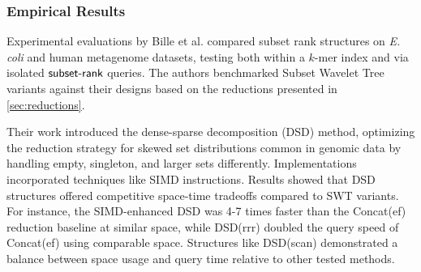 
\subsubsection*{Empirical Results}
Experimental evaluations by Bille et al. \cite{bille2023rank} compared subset rank structures on \emph{E. coli} and human metagenome datasets, testing both within a $k$-mer index and via isolated $\textsf{subset-rank}$ queries. The authors benchmarked Subset Wavelet Tree variants \cite{SubsetWT} against their designs based on the reductions presented in \autoref{sec:reductions}.

Their work introduced the dense-sparse decomposition (DSD) method, optimizing the reduction strategy for skewed set distributions common in genomic data by handling empty, singleton, and larger sets differently. Implementations incorporated techniques like SIMD instructions. Results showed that DSD structures offered competitive space-time tradeoffs compared to SWT variants. For instance, the SIMD-enhanced DSD was 4-7 times faster than the Concat(ef) reduction baseline \cite{alanko2023small} at similar space, while DSD(rrr) doubled the query speed of Concat(ef) using comparable space. Structures like DSD(scan) demonstrated a balance between space usage and query time relative to other tested methods.
